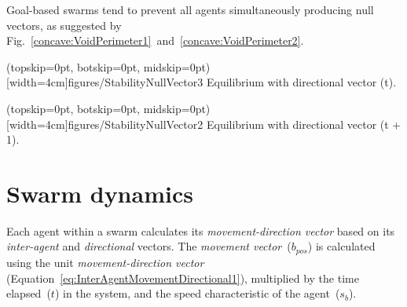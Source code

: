 \documentclass{ieeeaccess}
\begin{document}
Goal-based swarms tend to 
prevent all agents simultaneously producing null vectors, as suggested by
Fig.~\ref{concave:VoidPerimeter1}~and~\ref{concave:VoidPerimeter2}.

\Figure[t!](topskip=0pt, botskip=0pt, midskip=0pt)[width=4cm]{figures/StabilityNullVector3}
{Equilibrium with directional vector (t).\label{concave:VoidPerimeter1}}


\Figure[t!](topskip=0pt, botskip=0pt, midskip=0pt)[width=4cm]{figures/StabilityNullVector2}
{Equilibrium with directional vector (t + 1).\label{concave:VoidPerimeter2}}



\section{Swarm dynamics}\label{Section:SwarmDynamics}
Each agent within a swarm calculates its \textit{movement-direction vector}
based on its \textit{inter-agent} and \textit{directional} vectors. The
\textit{movement vector}~($b_{pos}$) is calculated using the unit
\textit{movement-direction vector}
(Equation~\ref{eq:InterAgentMovementDirectional1}), multiplied by the time
elapsed~($t$) in the system, and the speed characteristic of the agent~($s_b$).
\end{document}
